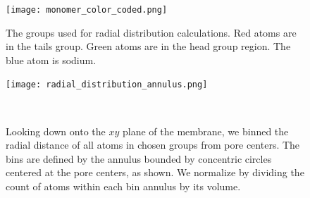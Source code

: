 \documentclass{article}
\begin{document}
  \begin{figure}
  \begin{minipage}{0.45\linewidth}
  \centering
  \texttt{[image: monomer\_color\_coded.png]}
  \vspace{4.5em}
  \caption{The groups used for radial distribution calculations. Red atoms are in the
  tails group. Green atoms are in the head group region. The blue atom is sodium.}\label{fig:monomer_color_coded}
  \end{minipage}\qquad
  \begin{minipage}{0.45\textwidth}
  \centering
  \texttt{[image: radial\_distribution\_annulus.png]}
  \caption{
  Looking down onto the $xy$ plane of the membrane, 
  we binned the radial distance of all atoms in chosen groups from
  pore centers. The bins are defined by the annulus bounded by concentric
  circles centered at the pore centers, as shown. We normalize by
  dividing the count of atoms within each bin annulus by its volume.
  }~\label{fig:rdf_diagram}
  \end{minipage}
  \end{figure}
\end{document}
